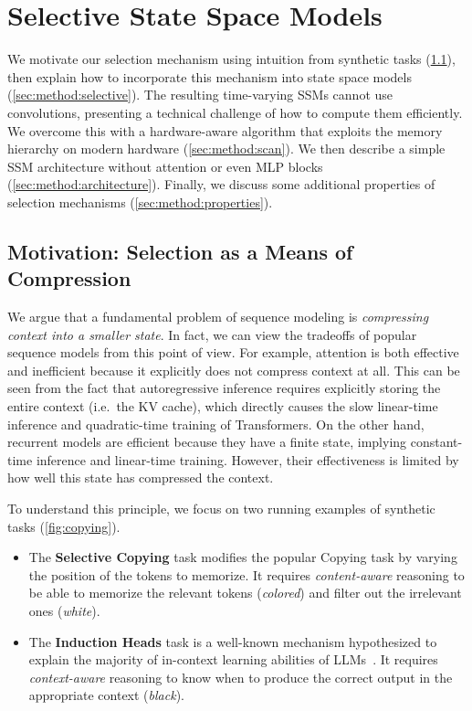 \section{Selective State Space Models}
\label{sec:method}

We motivate our selection mechanism using intuition from synthetic tasks (\ref{sec:method:motivation}), then explain how to incorporate this mechanism into state space models (\ref{sec:method:selective}).
The resulting time-varying SSMs cannot use convolutions, presenting a technical challenge of how to compute them efficiently. We overcome this with a hardware-aware algorithm that exploits the memory hierarchy on modern hardware (\ref{sec:method:scan}).
We then describe a simple SSM architecture without attention or even MLP blocks (\ref{sec:method:architecture}).
Finally, we discuss some additional properties of selection mechanisms (\ref{sec:method:properties}).

\subsection{Motivation: Selection as a Means of Compression}
\label{sec:method:motivation}

We argue that a fundamental problem of sequence modeling is \emph{compressing context into a smaller state}. In fact, we can view the tradeoffs of popular sequence models from this point of view. For example, attention is both effective and inefficient because it explicitly does not compress context at all. This can be seen from the fact that autoregressive inference requires explicitly storing the entire context (i.e.\ the KV cache), which directly causes the slow linear-time inference and quadratic-time training of Transformers. On the other hand, recurrent models are efficient because they have a finite state, implying constant-time inference and linear-time training. However, their effectiveness is limited by how well this state has compressed the context.

To understand this principle, we focus on two running examples of synthetic tasks (\ref{fig:copying}).

\begin{itemize}[leftmargin=*,itemsep=0pt,topsep=0pt]
  \item The \textbf{Selective Copying} task modifies the popular Copying task \citep{arjovsky2016unitary} by varying the position of the tokens to memorize. It requires \emph{content-aware} reasoning to be able to memorize the relevant tokens (\emph{colored}) and filter out the irrelevant ones (\emph{white}).
  \item The \textbf{Induction Heads} task is a well-known mechanism hypothesized to explain the majority of in-context learning abilities of LLMs~\citep{olsson2022context}. It requires \emph{context-aware} reasoning to know when to produce the correct output in the appropriate context (\emph{black}).
\end{itemize}

